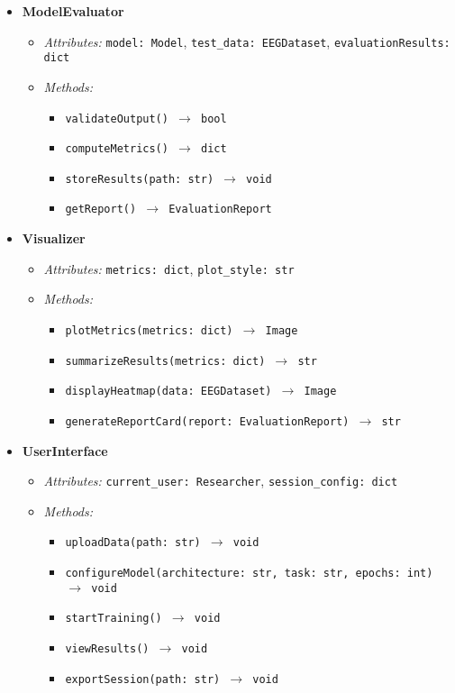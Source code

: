\begin{itemize}
    \item \textbf{ModelEvaluator}
    \begin{itemize}
        \item \textit{Attributes:} \texttt{model: Model}, \texttt{test\_data: EEGDataset}, \texttt{evaluationResults: dict}
        \item \textit{Methods:}
        \begin{itemize}
            \item \texttt{validateOutput() $\rightarrow$ bool}
            \item \texttt{computeMetrics() $\rightarrow$ dict}
            \item \texttt{storeResults(path: str) $\rightarrow$ void}
            \item \texttt{getReport() $\rightarrow$ EvaluationReport}
        \end{itemize}
    \end{itemize}

    \item \textbf{Visualizer}
    \begin{itemize}
        \item \textit{Attributes:} \texttt{metrics: dict}, \texttt{plot\_style: str}
        \item \textit{Methods:}
        \begin{itemize}
            \item \texttt{plotMetrics(metrics: dict) $\rightarrow$ Image}
            \item \texttt{summarizeResults(metrics: dict) $\rightarrow$ str}
            \item \texttt{displayHeatmap(data: EEGDataset) $\rightarrow$ Image}
            \item \texttt{generateReportCard(report: EvaluationReport) $\rightarrow$ str}
        \end{itemize}
    \end{itemize}

    \item \textbf{UserInterface}
    \begin{itemize}
        \item \textit{Attributes:} \texttt{current\_user: Researcher}, \texttt{session\_config: dict}
        \item \textit{Methods:}
        \begin{itemize}
            \item \texttt{uploadData(path: str) $\rightarrow$ void}
            \item \texttt{configureModel(architecture: str, task: str, epochs: int) $\rightarrow$ void}
            \item \texttt{startTraining() $\rightarrow$ void}
            \item \texttt{viewResults() $\rightarrow$ void}
            \item \texttt{exportSession(path: str) $\rightarrow$ void}
        \end{itemize}
    \end{itemize}
\end{itemize}


